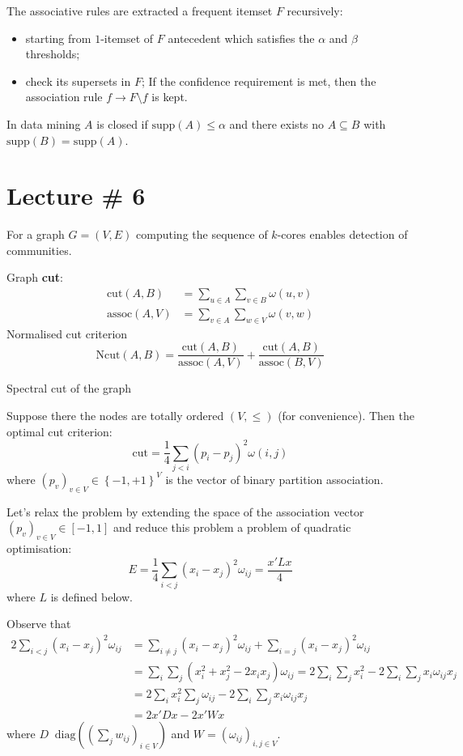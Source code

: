 \documentclass[a4paper]{article}
\newcommand{\obj}[1]{{\left\{ #1 \right \}}}
\newcommand{\clo}[1]{{\left [ #1 \right ]}}
\newcommand{\brac}[1]{{\left ( #1 \right )}}
\newcommand{\defn}{\mathop{\overset{\Delta}{=}}\nolimits}
\begin{document}
The associative rules are extracted a frequent itemset $F$ recursively:
\begin{itemize}
	\item starting from $1$-itemset of $F$ antecedent which satisfies the $\alpha$ and $\beta$ thresholds;
	\item check its supersets in $F$; If the confidence requirement is met, then the association rule $f\to F\setminus f$ is kept.
\end{itemize}

In data mining $A$ is closed if $\text{supp}(A)\leq \alpha$ and there exists no $A\subseteq B$ with $\text{supp}(B)=\text{supp}(A)$.





\section{Lecture \# 6} %
\label{sec:lecture_6}

For a graph $G=(V,E)$ computing the sequence of $k$-cores enables detection of communities.

Graph \textbf{cut}:
\begin{align*}
	\text{cut}(A,B) &= \sum_{u\in A} \sum_{v\in B} \omega(u, v)\\
	\text{assoc}(A,V) &= \sum_{v\in A} \sum_{w\in V} \omega(v,w)
\end{align*}
Normalised cut criterion
\[\text{Ncut}(A,B) = \frac{\text{cut}(A,B)}{\text{assoc}(A,V)} + \frac{\text{cut}(A,B)}{\text{assoc}(B,V)}\]

Spectral cut of the graph

Suppose there the nodes are totally ordered $(V,\leq)$ (for convenience). Then the optimal cut criterion: 
\[ \text{cut} = \frac{1}{4}\sum_{j<i} {(p_i - p_j)}^2 \omega(i,j) \]
where $\brac{p_v}_{v\in V}\in \obj{-1,+1}^V$ is the vector of binary partition association.

Let's relax the problem by extending the space of the association vector $\brac{p_v}_{v\in V}\in \clo{-1,1}$
and reduce this problem a problem of quadratic optimisation:
\[E = \frac{1}{4}\sum_{i<j} {(x_i-x_j)}^2 \omega_{ij} = \frac{x'Lx}{4}\]
where $L$ is defined below.

Observe that
\begin{align*}
	2\sum_{i<j} {(x_i-x_j)}^2 \omega_{ij} &= \sum_{i\neq j} {(x_i-x_j)}^2 \omega_{ij} + \sum_{i=j} {(x_i-x_j)}^2 \omega_{ij} \\
	&= \sum_i\sum_j (x_i^2 + x_j^2 - 2x_ix_j) \omega_{ij} = 2 \sum_i\sum_j x_i^2 - 2\sum_i\sum_j x_i \omega_{ij} x_j \\
	&= 2\sum_i x_i^2 \sum_j \omega_{ij} - 2\sum_i\sum_j x_i \omega_{ij} x_j \\
	&= 2 x' D x - 2 x' W x
\end{align*}
where $D\defn \text{diag}\brac{{(\sum_j w_{ij})}_{i\in V}}$ and $W = \brac{\omega_{ij}}_{i,j\in V}$.
\end{document}

